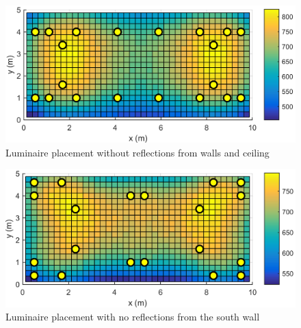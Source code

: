 \begin{figure}[tb]
  \centering
  \includegraphics[width=\columnwidth]{../Vysledky/MSTR_SLB_4x18W_5G4_Fit2_NoRef_V010_S1}
  \caption{Luminaire placement without reflections from walls and ceiling}
  \label{fig:V010_S1_NoRef}
\end{figure}

\begin{figure}[tb]
  \centering
  \includegraphics[width=\columnwidth]{../Vysledky/MSTR_SLB_4x18W_5G4_Fit2_NoSWall_V010_S1}
  \caption{Luminaire placement with no reflections from the south wall}
  \label{fig:V010_S1_NoSWall}
\end{figure}
